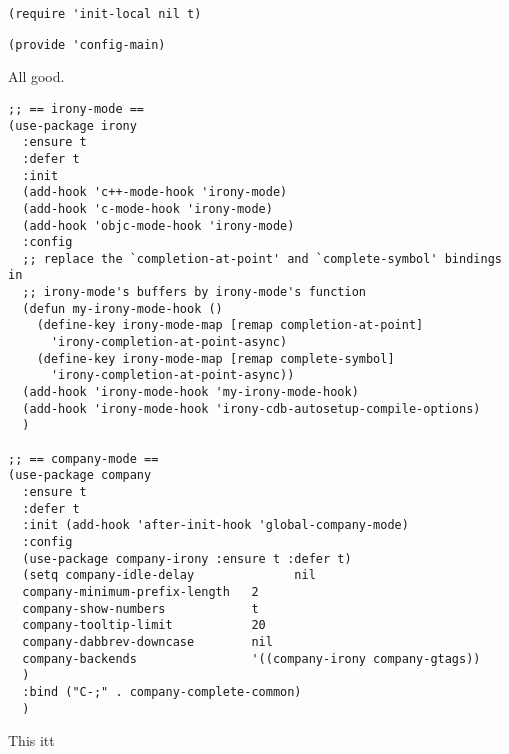 \documentclass[12pt]{article}
\begin{document}
\lstset{language=Lisp,label= ,caption= ,numbers=none}
\begin{lstlisting}
(require 'init-local nil t)
\end{lstlisting}


\lstset{language=Lisp,label= ,caption= ,numbers=none}
\begin{lstlisting}
(provide 'config-main)
\end{lstlisting}

All good.


\begin{verbatim}
;; == irony-mode ==
(use-package irony
  :ensure t
  :defer t
  :init
  (add-hook 'c++-mode-hook 'irony-mode)
  (add-hook 'c-mode-hook 'irony-mode)
  (add-hook 'objc-mode-hook 'irony-mode)
  :config
  ;; replace the `completion-at-point' and `complete-symbol' bindings in
  ;; irony-mode's buffers by irony-mode's function
  (defun my-irony-mode-hook ()
    (define-key irony-mode-map [remap completion-at-point]
      'irony-completion-at-point-async)
    (define-key irony-mode-map [remap complete-symbol]
      'irony-completion-at-point-async))
  (add-hook 'irony-mode-hook 'my-irony-mode-hook)
  (add-hook 'irony-mode-hook 'irony-cdb-autosetup-compile-options)
  )

;; == company-mode ==
(use-package company
  :ensure t
  :defer t
  :init (add-hook 'after-init-hook 'global-company-mode)
  :config
  (use-package company-irony :ensure t :defer t)
  (setq company-idle-delay              nil
  company-minimum-prefix-length   2
  company-show-numbers            t
  company-tooltip-limit           20
  company-dabbrev-downcase        nil
  company-backends                '((company-irony company-gtags))
  )
  :bind ("C-;" . company-complete-common)
  )
\end{verbatim}





This itt 
\end{document}

